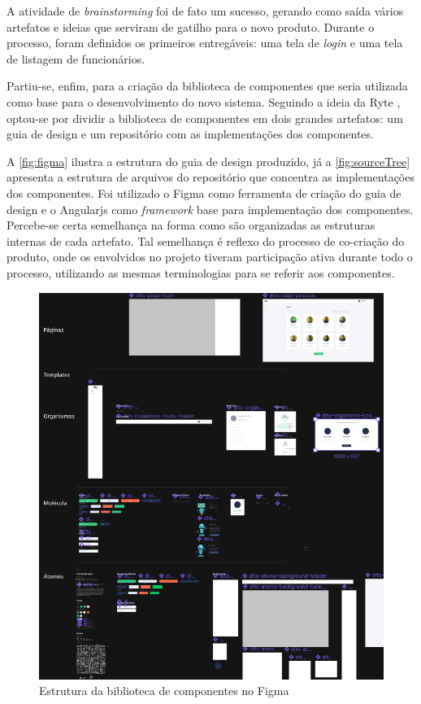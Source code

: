 A atividade de \textit{brainstorming} foi de fato um sucesso, gerando como saída vários artefatos e ideias que serviram de gatilho para o novo produto. Durante o processo, foram definidos os primeiros entregáveis: uma tela de \textit{login} e uma tela de listagem de funcionários.

Partiu-se, enfim, para a criação da biblioteca de componentes que seria utilizada como base para o desenvolvimento do novo sistema. Seguindo a ideia da Ryte \cite{ryteDesignSystem}, optou-se por dividir a biblioteca de componentes em dois grandes artefatos: um guia de design e um repositório com as implementações dos componentes.

A \autoref{fig:figma} ilustra a estrutura do guia de design produzido, já a \autoref{fig:sourceTree} apresenta a estrutura de arquivos do repositório que concentra as implementações dos componentes. Foi utilizado o Figma como ferramenta de criação do guia de design e o Angularjs como \textit{framework} base para implementação dos componentes. Percebe-se certa semelhança na forma como são organizadas as estruturas internas de cada artefato. Tal semelhança é reflexo do processo de co-criação do produto, onde os envolvidos no projeto tiveram participação ativa durante todo o processo, utilizando as mesmas terminologias para se referir aos componentes.

\begin{figure}
	\includegraphics[width=\linewidth]{./04-figuras/06_biblioteca_componentes/styleguide-figma.png}
  \caption{Estrutura da biblioteca de componentes no Figma}
  \label{fig:figma}
\end{figure}

